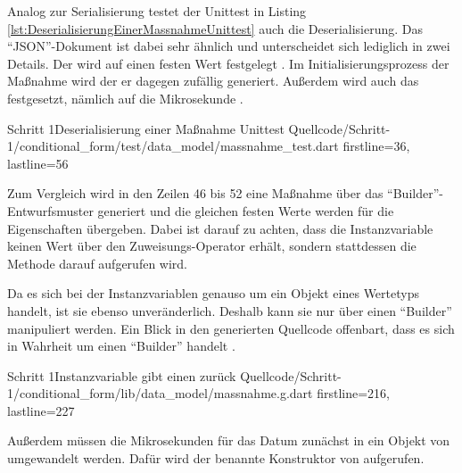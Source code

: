 Analog zur Serialisierung testet der Unittest in Listing \ref{lst:DeserialisierungEinerMassnahmeUnittest} auch die Deserialisierung.
Das \enquote{JSON}-Dokument ist dabei sehr ähnlich und unterscheidet sich lediglich in zwei Details.
Der  wird auf einen festen Wert festgelegt .
Im Initialisierungsprozess der Maßnahme wird der er dagegen zufällig generiert.
Außerdem wird auch das  festgesetzt, nämlich auf die Mikrosekunde  .

\begin{alexlisting}{Schritt 1}{Deserialisierung einer Maßnahme Unittest}
  {Quellcode/Schritt-1/conditional_form/test/data_model/massnahme_test.dart}
  {firstline=36, lastline=56}
  \label{lst:DeserialisierungEinerMassnahmeUnittest}
\end{alexlisting}


Zum Vergleich wird in den Zeilen 46 bis 52 eine Maßnahme über das \enquote{Builder}-Entwurfsmuster generiert und die gleichen festen Werte werden für die Eigenschaften übergeben.
Dabei ist darauf zu achten, dass die Instanzvariable  keinen Wert über den Zuweisungs-Operator \IC{=} erhält, sondern stattdessen die Methode  darauf aufgerufen wird.

Da es sich bei der Instanzvariablen  genauso um ein Objekt eines Wertetyps handelt, ist sie ebenso unveränderlich.
Deshalb kann sie nur über einen \enquote{Builder} manipuliert werden.
Ein Blick in den generierten Quellcode offenbart, dass es sich in Wahrheit um einen \enquote{Builder} handelt .

\begin{alexlisting}{Schritt 1}{Instanzvariable  gibt einen  zurück}
  {Quellcode/Schritt-1/conditional_form/lib/data_model/massnahme.g.dart}
  {firstline=216, lastline=227}
  \label{lst:Schritt1InstanzvariableLetzteBearbeitungGibtEinenLetzteBearbeitungBuilderZurueck}
\end{alexlisting}

Außerdem müssen die Mikrosekunden für das Datum zunächst in ein Objekt von  umgewandelt werden.
Dafür wird der benannte Konstruktor  von   aufgerufen.

